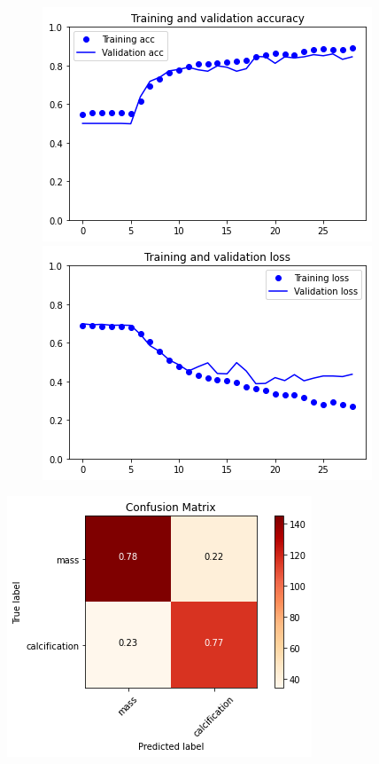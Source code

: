 \documentclass{article}
\begin{document}
\begin{figure}[h]
    \centering
    \begin{minipage}{0.45\textwidth}
        \centering
        \includegraphics[scale=0.46]{./img/scratchVal1.png}
    \end{minipage}\hfill
    \begin{minipage}{0.45\textwidth}
        \centering
        \includegraphics[scale=0.46]{./img/scratchLoss1.png}
    \end{minipage}
\end{figure}

\begin{center}
\begin{minipage}{0.45\textwidth}
        \includegraphics[scale=0.6]{./img/cmScratch1.png}
    \end{minipage}
\end{center}
\end{document}
